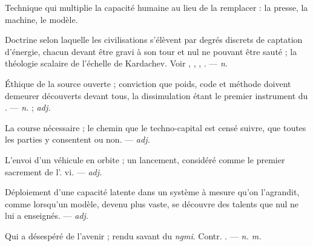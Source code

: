  Technique qui multiplie la capacité humaine au lieu de la remplacer : la presse, la machine, le modèle. 

 Doctrine selon laquelle les civilisations s'élèvent par degrés discrets de captation d'énergie, chacun devant être gravi à son tour et nul ne pouvant être sauté ; la théologie scalaire de l'échelle de Kardachev. Voir , , , . ---  \textit{n.}

 Éthique de la source ouverte ; conviction que poids, code et méthode doivent demeurer découverts devant tous, la dissimulation étant le premier instrument du .   ---  \textit{n.} ;  \textit{adj.}

 La course nécessaire ; le chemin que le techno-capital est censé suivre, que toutes les parties y consentent ou non.  ---  \textit{adj.}

 L'envoi d'un véhicule en orbite ; un lancement, considéré comme le premier sacrement de l'.   vi. ---  \textit{adj.}

 Déploiement d'une capacité latente dans un système à mesure qu'on l'agrandit, comme lorsqu'un modèle, devenu plus vaste, se découvre des talents que nul ne lui a enseignés.  ---  \textit{adj.}

 Qui a désespéré de l'avenir ; rendu savant du  \textit{ngmi}. Contr. . ---  \textit{n. m.}

